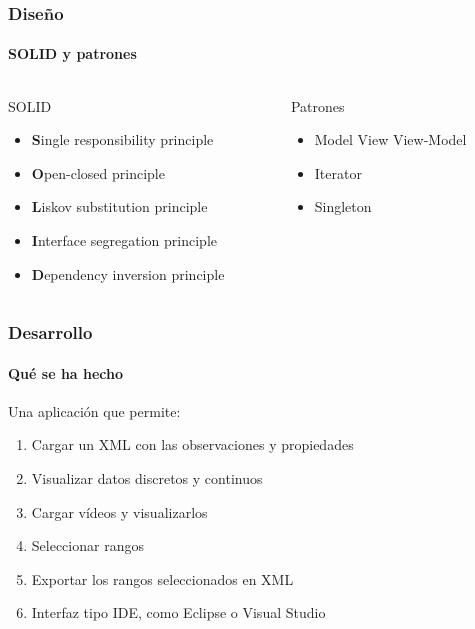 \begin{frame}
	\frametitle{Dise\~no}
	\framesubtitle{SOLID y patrones}
	\begin{columns}[T]
		
		\begin{column}[T]{0.5\linewidth}
			\begin{block}{SOLID}
				\begin{itemize}
					\item \textbf{S}ingle responsibility principle
					\item \textbf{O}pen-closed principle
					\item \textbf{L}iskov substitution principle
					\item \textbf{I}nterface segregation principle
					\item \textbf{D}ependency inversion principle
				\end{itemize}
			\end{block}
		\end{column}
		
		\begin{column}[T]{0.5\linewidth}
			\begin{block}{Patrones}
				\begin{itemize}
					\item Model View View-Model
					\item Iterator
					\item Singleton
				\end{itemize}
			\end{block}
		\end{column}
		
	\end{columns}

\end{frame}

\begin{frame}
	\frametitle{Desarrollo}
	\framesubtitle{Qu\'e se ha hecho}
	Una aplicaci\'on que permite:
	\begin{enumerate}
		\item Cargar un XML con las observaciones y propiedades
		\item Visualizar datos discretos y continuos
		\item Cargar v\'ideos y visualizarlos
		\item Seleccionar rangos
		\item Exportar los rangos seleccionados en XML
		\item Interfaz tipo IDE, como Eclipse o Visual 
		Studio
	\end{enumerate}
	
\end{frame}

